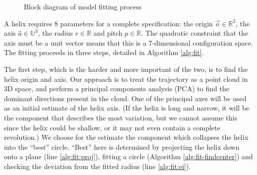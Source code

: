 \documentclass{article} %
\def\xvec{\vec}          \def\xvecstr{with an arrow}
\def\xuv{\hat}           \def\xuvstr{with a caret}
\def\xse{\bm}            \def\xsestr{in boldface}
\begin{document}
\begin{figure}[ht]
  \centering
  \caption{Block diagram of model fitting process}
  \label{fig:block-algo}
\end{figure}

A helix requires 8 parameters for a complete specification: the origin $\xvec{o} \in \mathbb{R}^3$, the axis $\xuv{a} \in \mathbb{U}^3$, the radius $r \in \mathbb{R}$ and pitch $p \in \mathbb{R}$. The quadratic constraint that the axis must be a unit vector means that this is a 7-dimensional configuration space. The fitting proceeds in three steps, detailed in Algorithm \ref{alg:fit}.

The first step, which is the harder and more important of the two, is to find the helix origin and axis. Our approach is to treat the trajectory as a point cloud in 3D space, and perform a principal components analysis (PCA) to find the dominant directions present in the cloud. One of the principal axes will be used as an initial estimate of the helix axis. (If the helix is long and narrow, it will be the component that describes the most variation, but we cannot assume this since the helix could be shallow, or it may not even contain a complete revolution.) We choose for the estimate the component which collapses the helix into the ``best'' circle. ``Best'' here is determined by projecting the helix down onto a plane (line \ref{alg:fit:proj}), fitting a circle (Algorithm \ref{alg:fit-findcenter}) and checking the deviation from the fitted radius (line \ref{alg:fit:ei}).
\end{document}

